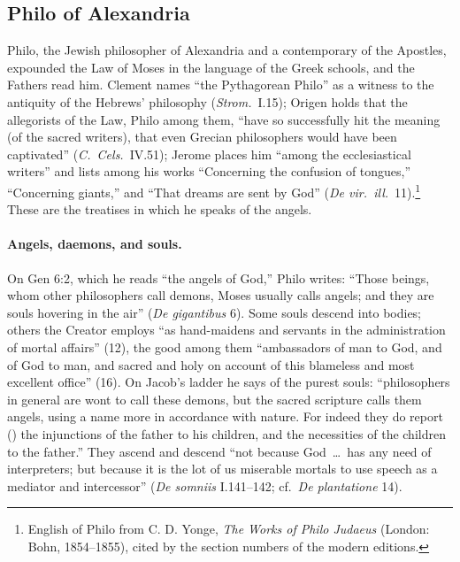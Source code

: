 \sectionguard
\subsection{Philo of Alexandria}\label{sec:bc-philo}

Philo, the Jewish philosopher of Alexandria and a contemporary of the
Apostles, expounded the Law of Moses in the language of the Greek schools,
and the Fathers read him. Clement names ``the Pythagorean Philo'' as a
witness to the antiquity of the Hebrews' philosophy (\emph{Strom.}\ I.15);
Origen holds that the allegorists of the Law, Philo among them, ``have so
successfully hit the meaning (of the sacred writers), that even Grecian
philosophers would have been captivated'' (\emph{C.\ Cels.}\ IV.51); Jerome
places him ``among the ecclesiastical writers'' and lists among his works
``Concerning the confusion of tongues,'' ``Concerning giants,'' and ``That
dreams are sent by God'' (\emph{De vir.\ ill.}\ 11).\footnote{English of
Philo from C. D. Yonge, \emph{The Works of Philo Judaeus} (London: Bohn,
1854--1855), cited by the section numbers of the modern editions.} These are
the treatises in which he speaks of the angels.

\paragraph{Angels, daemons, and souls.} On Gen 6:2, which he reads ``the
angels of God,'' Philo writes: ``Those beings, whom other philosophers call
demons, Moses usually calls angels; and they are souls hovering in the air''
(\emph{De gigantibus} 6). Some souls descend into bodies; others the Creator
employs ``as hand-maidens and servants in the administration of mortal
affairs'' (12), the good among them ``ambassadors of man to God, and of God
to man, and sacred and holy on account of this blameless and most excellent
office'' (16). On Jacob's ladder he says of the purest souls: ``philosophers
in general are wont to call these demons, but the sacred scripture calls
them angels, using a name more in accordance with nature. For indeed they do
report () the injunctions of the father to his children,
and the necessities of the children to the father.'' They ascend and
descend ``not because God~\dots\ has any need of interpreters; but because it
is the lot of us miserable mortals to use speech as a mediator and
intercessor'' (\emph{De somniis} I.141--142; cf.\ \emph{De plantatione} 14).

